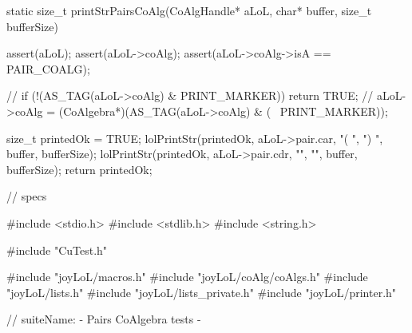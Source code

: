 static size_t printStrPairsCoAlg(CoAlgHandle* aLoL,
                                 char* buffer, size_t bufferSize) {
  assert(aLoL);
  assert(aLoL->coAlg);
  assert(aLoL->coAlg->isA == PAIR_COALG);

//  if (!(AS_TAG(aLoL->coAlg) & PRINT_MARKER)) return TRUE;
//  aLoL->coAlg = (CoAlgebra*)(AS_TAG(aLoL->coAlg) & (~ PRINT_MARKER));

  size_t printedOk = TRUE;
  lolPrintStr(printedOk, aLoL->pair.car, "( ", ") ", buffer, bufferSize);
  lolPrintStr(printedOk, aLoL->pair.cdr, "", "", buffer, bufferSize);
  return printedOk;
}




\stoptyping

\starttyping
// specs

#include <stdio.h>
#include <stdlib.h>
#include <string.h>

#include "CuTest.h"

#include "joyLoL/macros.h"
#include "joyLoL/coAlg/coAlgs.h"
#include "joyLoL/lists.h"
#include "joyLoL/lists_private.h"
#include "joyLoL/printer.h"

// suiteName: - Pairs CoAlgebra tests -

